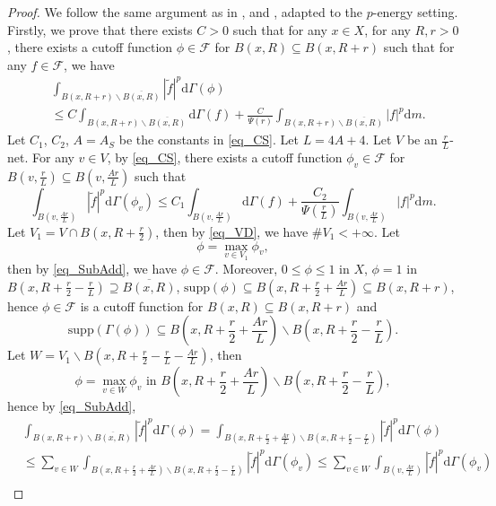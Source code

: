 \documentclass[11pt,a4paper]{article}
\numberwithin{equation}{section}
\theoremstyle{plain}
\theoremstyle{definition}
\begin{document}
\begin{proof}
We follow the same argument as in \cite[Lemma 5.1]{AB15}, \cite[PROPOSITION 5.11]{BM18} and \cite[Lemma 6.2]{Mur24a}, adapted to the $p$-energy setting. Firstly, we prove that there exists $C>0$ such that for any $x\in X$, for any $R, r>0$, there exists a cutoff function $\phi\in\mathcal{F}$ for $B(x,R)\subseteq B(x,R+r)$ such that for any $f\in\mathcal{F}$, we have
\begin{align}
&\int_{B(x,R+r)\backslash\overline{B(x,R)}}|\widetilde{f}|^p\mathrm{d}\Gamma(\phi)\nonumber\\
&\le C\int_{B(x,R+r)\backslash\overline{B(x,R)}}\mathrm{d}\Gamma(f)+\frac{C}{\Psi(r)}\int_{B(x,R+r)\backslash\overline{B(x,R)}}|f|^p\mathrm{d} m.\label{eq_CS_self1}
\end{align}
Let $C_1$, $C_2$, $A=A_S$ be the constants in \ref{eq_CS}. Let $L=4A+4$. Let $V$ be an $\frac{r}{L}$-net. For any $v\in V$, by \ref{eq_CS}, there exists a cutoff function $\phi_v\in\mathcal{F}$ for $B(v,\frac{r}{L})\subseteq B(v,\frac{Ar}{L})$ such that
$$\int_{B(v,\frac{Ar}{L})}|\widetilde{f}|^p\mathrm{d}\Gamma(\phi_v)\le C_{1}\int_{B(v,\frac{Ar}{L})}\mathrm{d}\Gamma(f)+\frac{C_{2}}{\Psi(\frac{r}{L})}\int_{B(v,\frac{Ar}{L})}|f|^p\mathrm{d} m.$$
Let ${V}_1=V\cap B(x,R+\frac{r}{2})$, then by \ref{eq_VD}, we have $\#V_1<+\infty$. Let
$$\phi=\max_{v\in{V}_1}\phi_v,$$
then by \ref{eq_SubAdd}, we have $\phi\in\mathcal{F}$. Moreover, $0\le\phi\le1$ in $X$, $\phi=1$ in $B(x,R+\frac{r}{2}-\frac{r}{L})\supseteq\overline{B(x,R)}$, $\mathrm{supp}(\phi)\subseteq B(x,R+\frac{r}{2}+\frac{Ar}{L})\subseteq B(x,R+r)$, hence $\phi\in\mathcal{F}$ is a cutoff function for $B(x,R)\subseteq B(x,R+r)$ and
$$\mathrm{supp}(\Gamma(\phi))\subseteq B(x,R+\frac{r}{2}+\frac{Ar}{L})\backslash{B(x,R+\frac{r}{2}-\frac{r}{L})}.$$
Let $W={V}_1\backslash B(x,R+\frac{r}{2}-\frac{r}{L}-\frac{Ar}{L})$, then
$$\phi=\max_{v\in W}\phi_v\text{ in }B(x,R+\frac{r}{2}+\frac{Ar}{L})\backslash{B(x,R+\frac{r}{2}-\frac{r}{L})},$$
hence by \ref{eq_SubAdd},
\begin{align*}
&\int_{B(x,R+r)\backslash\overline{B(x,R)}}|\widetilde{f}|^p\mathrm{d}\Gamma(\phi)=\int_{B(x,R+\frac{r}{2}+\frac{Ar}{L})\backslash{B(x,R+\frac{r}{2}-\frac{r}{L})}}|\widetilde{f}|^p\mathrm{d}\Gamma(\phi)\\
&\le\sum_{v\in W}\int_{{B(x,R+\frac{r}{2}+\frac{Ar}{L})\backslash{B(x,R+\frac{r}{2}-\frac{r}{L})}}}|\widetilde{f}|^p\mathrm{d}\Gamma(\phi_v)\le\sum_{v\in W}\int_{{B(v,\frac{Ar}{L})}}|\widetilde{f}|^p\mathrm{d}\Gamma(\phi_v)\\

\end{align*}
\end{proof}
\end{document}
